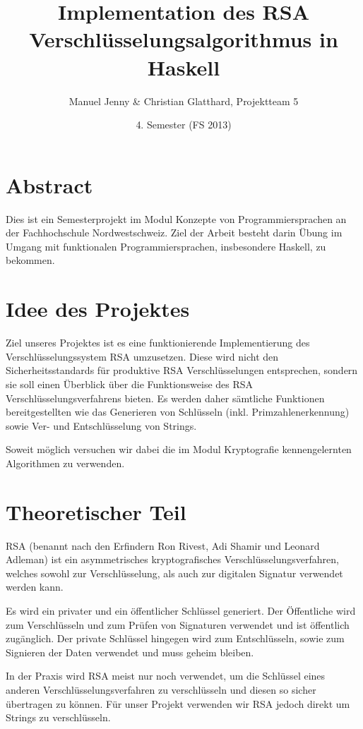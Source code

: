 \documentclass[a4paper, 11pt]{article} %
\title{Implementation des RSA Verschlüsselungsalgorithmus in Haskell}
\author{Manuel Jenny \& Christian Glatthard, Projektteam 5}
\date{4. Semester (FS 2013)}
\begin{document}
\maketitle

\setcounter{page}{1}


\section{Abstract}
Dies ist ein Semesterprojekt im Modul Konzepte von Programmiersprachen an der Fachhochschule Nordwestschweiz. Ziel der Arbeit besteht darin Übung im Umgang mit funktionalen Programmiersprachen, insbesondere Haskell, zu bekommen.

\section{Idee des Projektes}
Ziel unseres Projektes ist es eine funktionierende Implementierung des Verschlüsselungssystem RSA umzusetzen. Diese wird nicht den Sicherheitsstandards für produktive RSA Verschlüsselungen entsprechen, sondern sie soll einen Überblick über die Funktionsweise des RSA Verschlüsselungsverfahrens bieten. Es werden daher sämtliche Funktionen bereitgestellten wie das Generieren von Schlüsseln (inkl. Primzahlenerkennung) sowie Ver- und Entschlüsselung von Strings.

Soweit möglich versuchen wir dabei die im Modul Kryptografie kennengelernten Algorithmen zu verwenden.

\section{Theoretischer Teil}
RSA (benannt nach den Erfindern Ron Rivest, Adi Shamir und Leonard Adleman) ist ein asymmetrisches kryptografisches Verschlüsselungsverfahren, welches sowohl zur Verschlüsselung, als auch zur digitalen Signatur verwendet werden kann.

Es wird ein privater und ein öffentlicher Schlüssel generiert. Der Öffentliche wird zum Verschlüsseln und zum Prüfen von Signaturen verwendet und ist öffentlich zugänglich. Der private Schlüssel hingegen wird zum Entschlüsseln, sowie zum Signieren der Daten verwendet und muss geheim bleiben.

In der Praxis wird RSA meist nur noch verwendet, um die Schlüssel eines anderen Verschlüsselungsverfahren zu verschlüsseln und diesen so sicher übertragen zu können. Für unser Projekt verwenden wir RSA jedoch direkt um Strings zu verschlüsseln.
\end{document}
